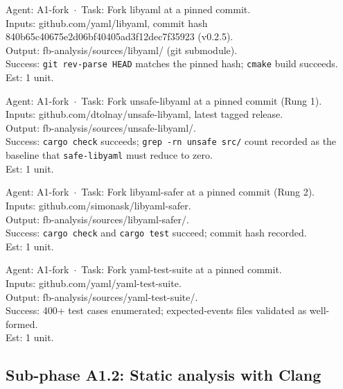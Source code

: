 \documentclass[12pt]{article}
\newcommand{\safelibyaml}{\texttt{safe-libyaml}}
\theoremstyle{definition}
\theoremstyle{remark}
\newenvironment{tasklist}{%
  \begingroup\raggedright
  \begin{description}[style=nextline, leftmargin=1.8cm, itemsep=0.4em]
}{%
  \end{description}
  \endgroup
}
\begin{document}
\begin{tasklist}

\item[T1.] {\ttfamily [~] Agent: A1-fork~$\cdot$~Task: Fork libyaml at a pinned commit.}\\
Inputs: github.com/yaml/libyaml, commit hash 840b65c40675e2d06bf40405ad3f12dec7f35923 (v0.2.5).\\
Output: fb-analysis/sources/libyaml/ (git submodule).\\
Success: \verb|git rev-parse HEAD| matches the pinned hash; \verb|cmake| build succeeds.\\
Est: 1 unit.

\item[T2.] {\ttfamily [~] Agent: A1-fork~$\cdot$~Task: Fork unsafe-libyaml at a pinned commit (Rung 1).}\\
Inputs: github.com/dtolnay/unsafe-libyaml, latest tagged release.\\
Output: fb-analysis/sources/unsafe-libyaml/.\\
Success: \verb|cargo check| succeeds; \verb|grep -rn unsafe src/| count recorded as the baseline that \safelibyaml{} must reduce to zero.\\
Est: 1 unit.

\item[T3.] {\ttfamily [~] Agent: A1-fork~$\cdot$~Task: Fork libyaml-safer at a pinned commit (Rung 2).}\\
Inputs: github.com/simonask/libyaml-safer.\\
Output: fb-analysis/sources/libyaml-safer/.\\
Success: \verb|cargo check| and \verb|cargo test| succeed; commit hash recorded.\\
Est: 1 unit.

\item[T4.] {\ttfamily [~] Agent: A1-fork~$\cdot$~Task: Fork yaml-test-suite at a pinned commit.}\\
Inputs: github.com/yaml/yaml-test-suite.\\
Output: fb-analysis/sources/yaml-test-suite/.\\
Success: 400+ test cases enumerated; expected-events files validated as well-formed.\\
Est: 1 unit.

\end{tasklist}

\subsection{Sub-phase A1.2: Static analysis with Clang}
\end{document}
